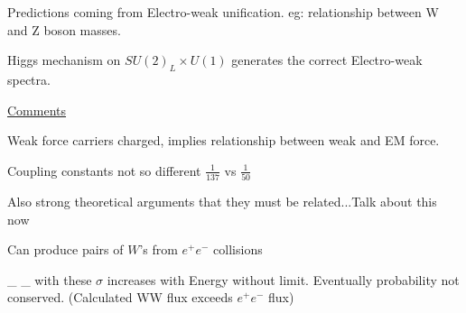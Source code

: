 {Predictions coming from Electro-weak unification.
eg: relationship between W and Z boson masses.


Higgs mechanism on $SU(2)_L \times U(1)$ generates the correct Electro-weak spectra. 

\clearpage

\underline{Comments}
\bi
\item[-] Weak force carriers charged, implies relationship between weak and EM force.
\item[-] Coupling constants not so different $\frac{1}{137}$ vs $\frac{1}{50}$
\item[-] Also strong theoretical arguments that they must be related...Talk about this now
\ei

Can produce pairs of $W$'s from $e^+e^-$ collisions

\be
{}_{}
\hspace*{0.7in}
_{}
\ee
with these $\sigma$ increases with Energy without limit.
Eventually probability not conserved.  (Calculated WW flux exceeds $e^+e^-$ flux)

}
